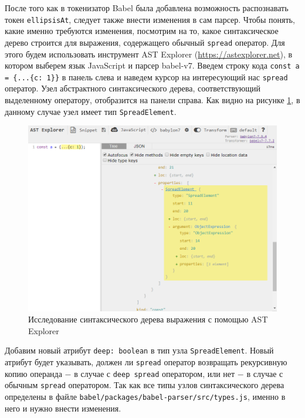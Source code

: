 \documentclass[14pt, a4paper]{article}
\def\code#1{\texttt{#1}} %
\begin{document}
После того как в токенизатор Babel была добавлена возможность распознавать токен \code{ellipsisAt},
следует также внести изменения в сам парсер. Чтобы понять, какие именно требуются изменения, посмотрим на то, какое
синтаксическое дерево строится для выражения, содержащего обычный \code{spread} оператор. Для этого будем использовать 
инструмент AST Explorer (\url{https://astexplorer.net}), в котором выберем язык JavaScript и парсер babel-v7.
Введем строку кода \code{const a = \{...\{c: 1\}\}} в панель слева и наведем курсор на интересующий 
нас \code{spread} оператор. Узел абстрактного синтаксического дерева, соответствующий выделенному оператору,
отобразится на панели справа. Как видно на рисунке \ref{ast_explorer}, в данному случае узел имеет тип 
\code{SpreadElement}.

\begin{figure}[h!]
  \centering
  \includegraphics[scale=0.7]{img/ast-explorer.png}
  \caption{Исследование синтаксического дерева выражения с помощью AST Explorer}
  \label{ast_explorer}
\end{figure}


Добавим новый атрибут \code{deep: boolean} в тип узла \code{SpreadElement}. Новый атрибут будет указывать,
должен ли \code{spread} оператор возвращать рекурсивную копию операнда $-$ в случае с \code{deep spread} оператором,
или нет $-$ в случае с обычным \code{spread} оператором. Так как все типы узлов синтаксического дерева 
определены в файле \code{babel/packages/babel-parser/src/types.js}, именно в него и нужно внести изменения. 


\end{document}
